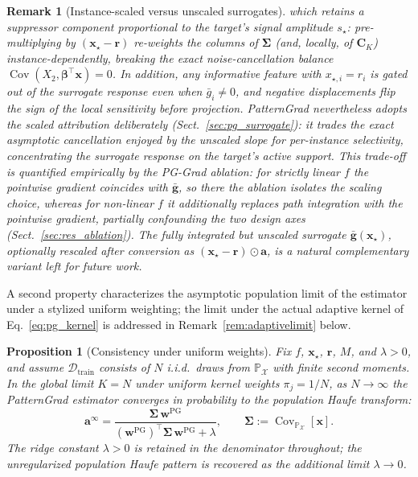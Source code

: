 \documentclass[pdflatex,sn-mathphys-num]{sn-jnl}
\theoremstyle{thmstyleone}
\newtheorem{proposition}[theorem]{Proposition}
\theoremstyle{thmstyletwo}%
\newtheorem{remark}{Remark}%
\theoremstyle{thmstylethree}%
\begin{document}
\begin{remark}[Instance-scaled versus unscaled surrogates]
which retains a suppressor component proportional to the target's signal amplitude $s_\star$: pre-multiplying by $(\mathbf{x}_\star - \mathbf{r})$ re-weights the columns of $\boldsymbol{\Sigma}$ (and, locally, of $\mathbf{C}_K$) instance-dependently, breaking the exact noise-cancellation balance $\operatorname{Cov}(X_2, \boldsymbol{\beta}^\top \mathbf{x}) = 0$. In addition, any informative feature with $x_{\star,i} = r_i$ is gated out of the surrogate response even when $\bar{g}_i \neq 0$, and negative displacements flip the sign of the local sensitivity before projection. PatternGrad nevertheless adopts the scaled attribution deliberately (Sect.~\ref{sec:pg_surrogate}): it trades the exact asymptotic cancellation enjoyed by the unscaled slope for per-instance selectivity, concentrating the surrogate response on the target's active support. This trade-off is quantified empirically by the PG-Grad ablation: for strictly linear $f$ the pointwise gradient coincides with $\bar{\mathbf{g}}$, so there the ablation isolates the scaling choice, whereas for non-linear $f$ it additionally replaces path integration with the pointwise gradient, partially confounding the two design axes (Sect.~\ref{sec:res_ablation}). The fully integrated but unscaled surrogate $\bar{\mathbf{g}}(\mathbf{x}_\star)$, optionally rescaled after conversion as $(\mathbf{x}_\star - \mathbf{r}) \odot \mathbf{a}$, is a natural complementary variant left for future work.
\end{remark}

A second property characterizes the asymptotic population limit of the estimator under a stylized uniform weighting; the limit under the actual adaptive kernel of Eq.~\eqref{eq:pg_kernel} is addressed in Remark~\ref{rem:adaptivelimit} below.

\begin{proposition}[Consistency under uniform weights]\label{prop:consistency}
Fix $f$, $\mathbf{x}_\star$, $\mathbf{r}$, $M$, and $\lambda > 0$, and assume $\mathcal{D}_{\text{train}}$ consists of $N$ i.i.d.\ draws from $\mathbb{P}_{\mathcal{X}}$ with finite second moments. In the global limit $K = N$ under uniform kernel weights $\pi_j = 1/N$, as $N \to \infty$ the PatternGrad estimator converges in probability to the population Haufe transform:
\begin{equation}
    \mathbf{a}^{\infty} = \frac{\boldsymbol{\Sigma}\, \mathbf{w}^{\text{PG}}}{(\mathbf{w}^{\text{PG}})^\top \boldsymbol{\Sigma}\, \mathbf{w}^{\text{PG}} + \lambda}, \qquad \boldsymbol{\Sigma} \mathrel{:=} \operatorname{Cov}_{\mathbb{P}_{\mathcal{X}}}[\mathbf{x}].
    \label{eq:pg_limit}
\end{equation}
The ridge constant $\lambda > 0$ is retained in the denominator throughout; the unregularized population Haufe pattern is recovered as the additional limit $\lambda \to 0$.
\end{proposition}
\end{document}
